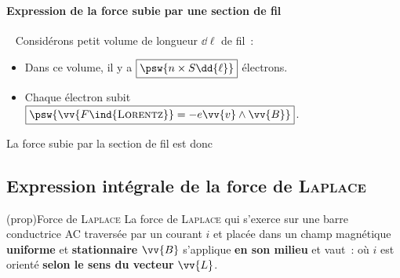\documentclass[../../main/main.tex]{subfiles}
\begin{document}
\begin{tcb*}
	\paragraph*{Expression de la force subie par une section de fil}~
	\smallbreak
	Considérons petit volume de longueur $\dd{\ell}$ de fil~:
	\smallbreak
	\begin{isd}[righthand ratio=.45]
		\begin{itemize}
			\setlength{\fboxsep}{3mm}
			\item Dans ce volume, il y a $\boxed{\psw{n\times S \dd{\ell}}}$ électrons.
			\item Chaque électron subit $\boxed{\psw{\vv{F\ind{\textsc{Lorentz}}} = -e
						      \vv{v} \wedge \vv{B}}}$.
		\end{itemize}
		\tcblower
		La force subie par la section de fil est donc
	\end{isd}
\end{tcb*}

\subsection{Expression intégrale de la force de \textsc{Laplace}}
\label{ssec:lplint}
\begin{tcb*}(prop){Force de \textsc{Laplace}}
	La force de \textsc{Laplace} qui s'exerce sur une barre conductrice AC
	traversée par un courant $i$ et placée dans un champ magnétique
	\textbf{uniforme} et \textbf{stationnaire} $\vv{B}$ s'applique \textbf{en
		son milieu} et vaut~:
	\psw{%
		\[
			\boxed{\vv{F_{\textsc{Laplace}}} = i \vv{L}\wedge \vv{B}}
		\]
	}%
	où $i$ est orienté \textbf{selon le sens du vecteur} $\vv{L}$.
\end{tcb*}
\end{document}

